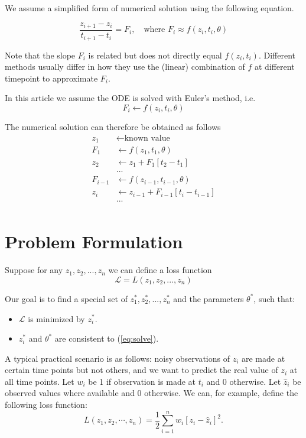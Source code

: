 \documentclass{article}
\newcommand{\LL}{{\mathcal L}}
\begin{document}
We assume a simplified form of numerical solution using the following equation.

\begin{equation}
\label{eq:solve}
\frac{z_{i+1} - z_i}{t_{i+1} - t_i} = F_i, \quad\text{where } F_i \approx f(z_i, t_i, \theta)
\end{equation}

Note that the slope $F_i$ is related but does not directly equal $f(z_i, t_i)$.
Different methods usually differ in how they use the (linear) combination of $f$ at different timepoint to approximate $F_i$.

In this article we assume the ODE is solved with Euler's method, i.e.
$$
F_i \leftarrow f(z_i, t_i, \theta)
$$

The numerical solution can therefore be obtained as follows
\begin{align*}
		z_1 & \leftarrow \text{known value}\\
		F_1 & \leftarrow f(z_1, t_1, \theta) \\
		z_2 & \leftarrow z_1 + F_1 [t_2 - t_1]	   \\
		& ... \\
		F_{i-1} & \leftarrow f(z_{i-1}, t_{i-1}, \theta) \\
		z_i & \leftarrow z_{i-1} + F_{i-1} [t_i - t_{i-1}]	 \\ 
		& ... \\
\end{align*}



\section{Problem Formulation}

Suppose for any $z_1, z_2, ..., z_n$ we can define a loss function
$$
	\LL = L(z_1, z_2, ..., z_n)
$$

Our goal is to find a special set of $z^*_1, z^*_2, ..., z^*_n$ and the parameters $\theta^*$, such that:
\begin{itemize}
	\item $\LL$ is minimized by $z^*_i$.
	\item $z^*_i$ and $\theta^*$ are consistent to (\ref{eq:solve}).
\end{itemize}

A typical practical scenario is as follows: noisy observations of $z_i$ are made at certain time points but not others, and we want to predict the real value of $z_i$ at all time points.   Let $w_i$ be 1 if observation is made at $t_i$ and 0 otherwise.  Let $\hat{z}_i$ be observed values where available and 0 otherwise.  We can, for example, define the following loss function:
$$
L(z_1, z_2, \cdots, z_n) = \frac{1}{2}\sum_{i=1}^{n} w_i [z_i - \hat{z}_i]^2.
$$
\end{document}
